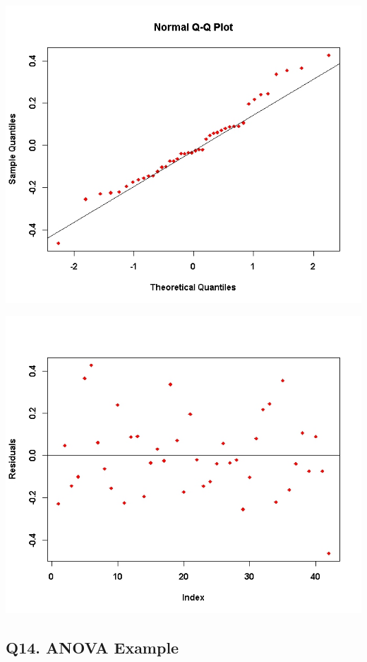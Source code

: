 \documentclass[a4paper,12pt]{article}
\begin{document}
\begin{center}
	\includegraphics[scale=0.55]{images/ExamQ5qqplot}
\end{center}
\begin{center}
	\includegraphics[scale=0.55]{images/ExamQ5resid}
\end{center}

\subsection*{Q14. ANOVA  Example }
	
\end{document}

